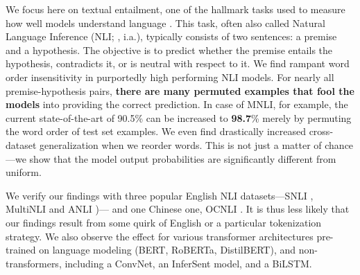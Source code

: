 \documentclass[11pt,a4paper]{article}
\begin{document}
We focus here on textual entailment, one of the hallmark tasks used to measure how well models understand language \citep{condoravdi-etal-2003-entailment, dagan-etal-2005-pascal}. This task, often also called Natural Language Inference (NLI; \citealt{bowman-etal-2015-large}, i.a.), typically consists of two sentences: a premise and a hypothesis. The objective is to predict whether the premise entails the hypothesis, contradicts it, or is neutral with respect to it.  We find rampant word order insensitivity in purportedly high performing NLI models. %
For nearly all premise-hypothesis pairs, \textbf{there are many permuted examples that fool the models} into providing the correct prediction. In case of MNLI, for example, the current state-of-the-art of 90.5\% can be increased to \textbf{98.7}\% merely by permuting the word order of test set examples. We even find drastically increased cross-dataset generalization when we reorder words. This is not just a matter of chance---we show that the model output probabilities are significantly different from uniform. 

We verify our findings with three popular English NLI datasets---SNLI \citep{bowman-etal-2015-large}, MultiNLI \citep{williams-etal-2018-broad} and ANLI \citep{nie-etal-2020-adversarial})---%
and one Chinese one, OCNLI \cite{hu-etal-2020-ocnli}. It is thus less likely that our findings result from some quirk of English or a particular tokenization strategy. 
We also observe the effect for various transformer architectures pre-trained on language modeling (BERT, RoBERTa, DistilBERT), and non-transformers, including a ConvNet, an InferSent model, and a BiLSTM.
\end{document}
